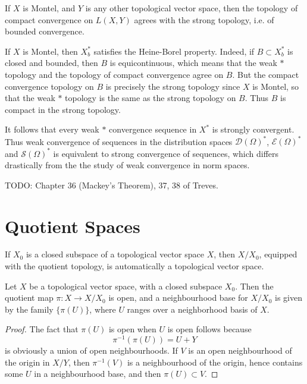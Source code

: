\begin{theorem}
    If $X$ is Montel, and $Y$ is any other topological vector space, then the topology of compact convergence on $L(X,Y)$ agrees with the strong topology, i.e. of bounded convergence.
\end{theorem}

If $X$ is Montel, then $X^*_b$ satisfies the Heine-Borel property. Indeed, if $B \subset X^*_b$ is closed and bounded, then $B$ is equicontinuous, which means that the weak $*$ topology and the topology of compact convergence agree on $B$. But the compact convergence topology on $B$ is precisely the strong topology since $X$ is Montel, so that the weak $*$ topology is the same as the strong topology on $B$. Thus $B$ is compact in the strong topology.

It follows that every weak $*$ convergence sequence in $X^*$ is strongly convergent. Thus weak convergence of sequences in the distribution spaces $\mathcal{D}(\Omega)^*$, $\mathcal{E}(\Omega)^*$ and $\mathcal{S}(\Omega)^*$ is equivalent to strong convergence of sequences, which differs drastically from the the study of weak convergence in norm spaces.

TODO: Chapter 36 (Mackey's Theorem), 37, 38 of Treves.

\section{Quotient Spaces}

If $X_0$ is a closed subspace of a topological vector space $X$, then $X/X_0$, equipped with the quotient topology, is automatically a topological vector space.

\begin{theorem}
    Let $X$ be a topological vector space, with a closed subspace $X_0$. Then the quotient map $\pi: X \to X/X_0$ is open, and a neighbourhood base for $X/X_0$ is given by the family $\{ \pi(U) \}$, where $U$ ranges over a neighborhood basis of $X$.
\end{theorem}
\begin{proof}
    The fact that $\pi(U)$ is open when $U$ is open follows because
    \[ \pi^{-1}(\pi(U)) = U + Y \]
    is obviously a union of open neighbourhoods. If $V$ is an open neighbourhood of the origin in $X/Y$, then $\pi^{-1}(V)$ is a neighbourhood of the origin, hence contains some $U$ in a neighbourhood base, and then $\pi(U) \subset V$.
\end{proof}

